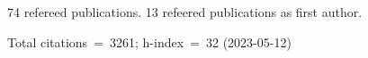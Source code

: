 74 refereed publications. 13 refeered publications as first author.

Total citations~=~3261; h-index~=~32 (2023-05-12)